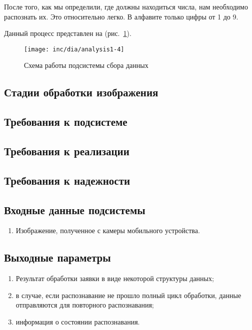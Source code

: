 После того, как мы определили, где должны находиться числа, нам необходимо распознать их. Это относительно легко. В алфавите только цифры от 1 до 9.

Данный процесс представлен на (рис.~\ref{fig:fig04}).
\begin{figure}
  \centering
  \texttt{[image: inc/dia/analysis1-4]}
  \caption{Схема работы подсистемы сбора данных}
  \label{fig:fig04}
\end{figure}


\subsection{Стадии обработки изображения}

\subsection{Требования к подсистеме}

\subsection{Требования к реализации}

\subsection{Требования к надежности}

\subsection{Входные данные подсистемы}

\begin{enumerate}
 \item Изображение, полученное с камеры мобильного устройства.
\end{enumerate}

\subsection{Выходные параметры}
\begin{enumerate}
 \item Результат обработки заявки в виде некоторой структуры данных;
 \item в случае, если распознавание не прошло полный цикл обработки, данные отправляются для повторного распознавания;
 \item информация о состоянии распознавания.
\end{enumerate}


